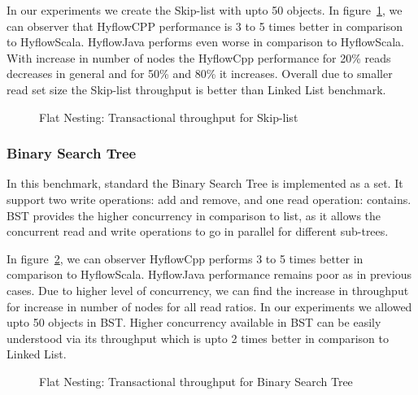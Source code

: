 \documentclass[12pt,english]{report}
\begin{document}
In our experiments we create the Skip-list with upto 50 objects. In figure~\ref{Fig:flatSkipList}, we can observer that HyflowCPP performance is 3 to 5 times better in comparison to HyflowScala. HyflowJava performs even worse in comparison to HyflowScala. With increase in number of nodes the HyflowCpp performance for 20\% reads decreases in general and for 50\% and 80\%  it increases. Overall due to smaller read set size the Skip-list throughput is better than Linked List benchmark. 

\begin{figure}[H]
\centering
{}
\end{figure}
\begin{figure}[H]
\centering
{}
\end{figure}
\begin{figure}[H]
\centering
{}
\caption{Flat Nesting: Transactional throughput for Skip-list}
\label{Fig:flatSkipList}
\end{figure}

\subsubsection{Binary Search Tree}
In this benchmark, standard the Binary Search Tree is implemented as a set. It support two write operations: add and remove, and one read operation: contains. BST provides the higher concurrency in comparison to list, as it allows the concurrent read and write operations to go in parallel for different sub-trees. 

In figure~\ref{Fig:flatBst}, we can observer HyflowCpp performs 3 to 5 times better in comparison to HyflowScala. HyflowJava performance remains poor as in previous cases. Due to higher level of concurrency, we can find the increase in throughput for increase in number of nodes for all read ratios. In our experiments we allowed upto 50 objects in BST. Higher concurrency available in BST can be easily understood via its throughput which is upto 2 times better in comparison to Linked List.

\begin{figure}[H]
\centering
{}
\end{figure}
\begin{figure}[H]
\centering
{}
\end{figure}
\begin{figure}[H]
\centering
{}
\caption{Flat Nesting: Transactional throughput for Binary Search Tree}
\label{Fig:flatBst}
\end{figure}
\end{document}
